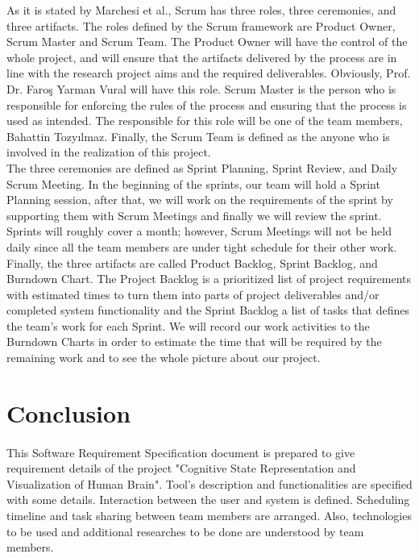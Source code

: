 \documentclass[paper=a4, fontsize=12pt]{scrartcl}	%
\numberwithin{equation}{section}		%
\numberwithin{figure}{section}			%
\numberwithin{table}{section}				%
\begin{document}
As it is stated by Marchesi et al., Scrum has three roles, three ceremonies, and three artifacts. The roles defined by the Scrum framework are Product Owner, Scrum Master and Scrum Team. The Product Owner will have the control of the whole project, and will ensure that the artifacts delivered by the process are in line with the research project aims and the required deliverables. Obviously, Prof. Dr. Faroş Yarman Vural will have this role. Scrum Master is the person who is responsible for enforcing the rules of the process and ensuring that the process is used as intended. The responsible for this role will be one of the team members, Bahattin Tozyılmaz. Finally, the Scrum Team is defined as the anyone who is involved in the realization of this project. \\

The three ceremonies are defined as Sprint Planning, Sprint Review, and Daily Scrum Meeting. In the beginning of the sprints, our team will hold a Sprint Planning session, after that, we will work on the requirements of the sprint by supporting them with Scrum Meetings and finally we will review the sprint. Sprints will roughly cover a month; however, Scrum Meetings will not be held daily since all the team members are under tight schedule for their other work. \\

Finally, the three artifacts are called Product Backlog, Sprint Backlog, and Burndown Chart. The Project Backlog is a prioritized list of project requirements with estimated times to turn them into parts of project deliverables and/or completed system functionality and the Sprint Backlog a list of tasks that defines the team's work for each Sprint. We will record our work activities to the Burndown Charts in order to estimate the time that will be required by the remaining work and to see the whole picture about our project. \\
	
    \newpage
	\section{Conclusion}
		\paragraph{}
        \normalsize
        This Software Requirement Specification document is prepared to give requirement details of the project "Cognitive State Representation and Visualization of Human Brain". Tool's description and functionalities are specified with some details. Interaction between the user and system is defined. Scheduling timeline and task sharing between team members are arranged. Also, technologies to be used and additional researches to be done are understood by team members.\\

\end{document}
